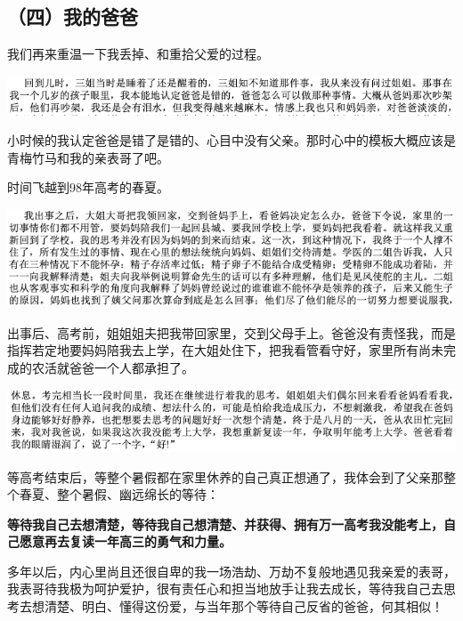 \documentclass[9pt, b5paper]{article}
\begin{document}
\subsection{（四）我的爸爸}
\label{sec:orgefb7367}

我们再来重温一下我丢掉、和重拾父爱的过程。

\begin{center}
\includegraphics[width=.9\linewidth]{./pic/backups_plans_20210422_223112.png}
\end{center}

小时候的我认定爸爸是错了是错的、心目中没有父亲。那时心中的模板大概应该是青梅竹马和我的亲表哥了吧。 

时间飞越到98年高考的春夏。 

\begin{center}
\includegraphics[width=.9\linewidth]{./pic/backups_plans_20210422_174607.png}
\end{center}

出事后、高考前，姐姐姐夫把我带回家里，交到父母手上。爸爸没有责怪我，而是指挥若定地要妈妈陪我去上学，在大姐处住下，把我看管看守好，家里所有尚未完成的农活就爸爸一个人都承担了。 

\begin{center}
\includegraphics[width=.9\linewidth]{./pic/backups_plans_20210422_174532.png}
\end{center}

等高考结束后，等整个暑假都在家里休养的自己真正想通了，我体会到了父亲那整个春夏、整个暑假、幽远绵长的等待：

\textbf{等待我自己去想清楚，等待我自己想清楚、并获得、拥有万一高考我没能考上，自己愿意再去复读一年高三的勇气和力量。}

多年以后，内心里尚且还很自卑的我一场浩劫、万劫不复般地遇见我亲爱的表哥，我表哥待我极为呵护爱护，很有责任心和担当地放手让我去成长，等待我自己去思考去想清楚、明白、懂得这份爱，与当年那个等待自己反省的爸爸，何其相似！
\end{document}
